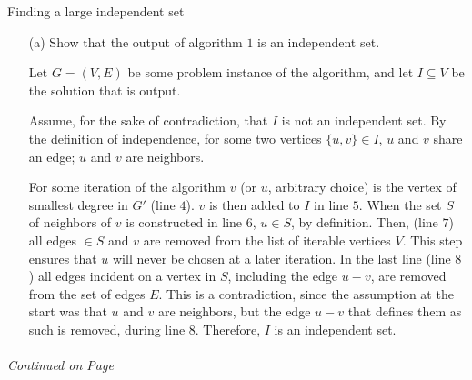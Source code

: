 \documentclass[11pt]{article}
\begin{document}
\begin{algorithm}
  \caption{Finding a large independent set}
  \begin{algorithmic}[1]
    \EndWhile
  \end{algorithmic}
\end{algorithm}

\begin{itemize}

\item[(a)] Show that the output of algorithm $1$ is an independent set. 

  Let $G=(V,E)$ be some problem instance of the algorithm, and let $I\subseteq V$
  be the solution that is output.
  
  Assume, for the sake of contradiction, that $I$ is not an independent set. 
  By the definition of independence, for some two vertices $\{u,v\}\in I$, $u$ and 
  $v$ share an edge; $u$ and $v$ are neighbors. 
  
  For some iteration of the algorithm $v$ (or $u$, arbitrary choice) is the vertex of
  smallest degree in $G'$ (line $4$). $v$ is then added to $I$ in line $5$.
  When the set $S$ of neighbors of $v$ is constructed
  in line $6$, $u\in S$, by definition. Then, (line $7$) all edges $\in S$ and $v$ are removed
  from the list of iterable vertices $V$. This step ensures that $u$ will never be
  chosen at a later iteration. In the last line (line $8$) all edges incident on a
  vertex in $S$, including the edge $u - v$, are removed from the set of edges $E$. This 
  is a contradiction, since the assumption at the start was that $u$ and $v$ are neighbors, 
  but the edge $u - v$ that defines them as such is removed, during line $8$. Therefore,
  $I$ is an independent set. 

\end{itemize}

\label{pg:end-of-p4}

\paragraph{} \emph{Continued on Page \pageref{pg:p4-continuation}}
\end{document}
